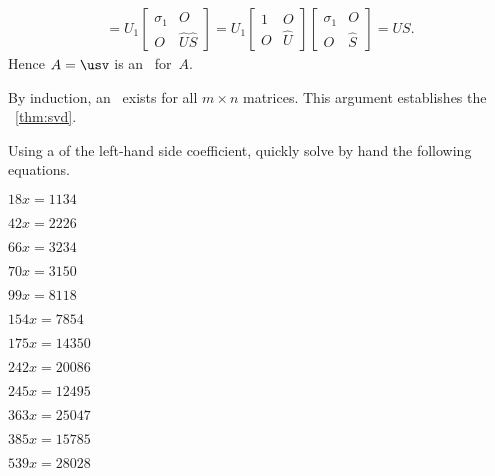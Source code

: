 \begin{enumerate}
\begin{eqnarray*}
=U_1\begin{bmatrix} \sigma_1&O \\O&\hat U\hat S \end{bmatrix}
=U_1\begin{bmatrix} 1&O \\O&\hat U \end{bmatrix}
\begin{bmatrix} \sigma_1&O \\O&\hat S \end{bmatrix}
=US.
\end{eqnarray*}
Hence \(A=\usv\) is an \svd\ for~\(A\). 
\end{enumerate}
By induction, an \svd\ exists for all \(m\times n\) matrices.
This argument establishes the \svd\ \cref{thm:svd}.







\sectionExercises



\begin{exercise}  
Using a  of the left-hand side coefficient, quickly solve by hand the following equations.
\begin{Parts}
\item \(18 x=1134\)
\begin{reduce}
\item \(42 x=2226\)
\item \(66 x=3234\)
\end{reduce}
\item \(70 x=3150\)
\item \(99 x=8118\)
\begin{reduce}
\item \(154 x=7854\)
\item \(175 x=14350\)
\end{reduce}
\item \(242 x=20086\)
\item \(245 x=12495\)
\begin{reduce}
\item \(363 x=25047\)
\item \(385 x=15785\)
\end{reduce}
\item \(539 x=28028\)
\end{Parts}
\end{exercise}




